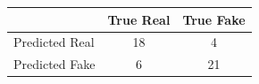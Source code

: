 \begin{tabular}{lcc}
\toprule
 & True Real & True Fake \\
\midrule
Predicted Real & 18 & 4 \\
Predicted Fake & 6 & 21 \\
\bottomrule
\end{tabular}
